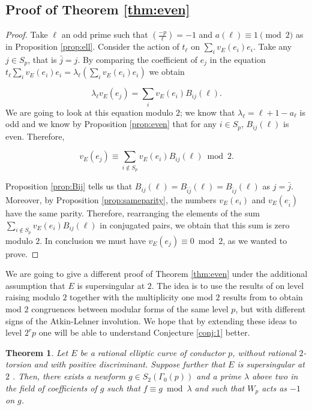 \documentclass[13pt]{amsart}
\newtheorem{theorem}{Theorem}
\theoremstyle{remark}
\numberwithin{theorem}{section} \numberwithin{equation}{section}
\begin{document}
\subsection{Proof of Theorem \ref{thm:even}}

\begin{proof}
Take $\ell$ an odd prime such that $\left(\frac{-p}{\ell}\right)= -1$ and 
$a(\ell)\equiv 1 \pmod{2}$ as in Proposition \ref{prop:ell}. Consider the action 
of $t_{\ell}$ on $\sum_i v_E(e_i)e_i$. Take any $j \in S_p$, that is 
$\bar{j}=j$. By comparing the coefficient of $e_j$ in the equation 
$t_{\ell}\sum_i v_E(e_i)e_i= \lambda_{\ell} (\sum_i v_E(e_i)e_i)$ we obtain

\[ \lambda_{\ell}v_E(e_{j})= \sum_i v_E(e_i)B_{ij}(\ell)  .\]
 We are going to look at this equation modulo $2$; we know that $\lambda_{\ell}=\ell+1-a_{\ell}$ is odd and we know by Proposition \ref{prop:even} that for any $i \in S_{p}$, $B_{ij}(\ell)$ is even. Therefore,
 
 \[  v_E(e_j) \equiv \sum_{i \not \in S_p} v_E(e_i) B_{ij}(\ell) \bmod{2}  . \]
 
 Proposition \ref{prop:Bij} tells us that 
$B_{ij}(\ell)=B_{\bar{i}\bar{j}}(\ell)=B_{\bar{i}j}(\ell)$ as $j=\bar{j}$. 
Moreover, by Proposition \ref{prop:sameparity}, the numbers $v_E(e_{i})$ and 
$v_E(e_{\bar{i}})$ have the same parity. Therefore, rearranging the elements of 
the sum $\sum_{i \not \in S_p} v_E(e_i) B_{ij}(\ell)$ in conjugated pairs, we 
obtain that this sum is zero modulo $2$. In conclusion we must have 
$v_E(e_j) \equiv 0 \bmod{2}$, as we wanted to prove.
\end{proof}

\bigskip
We are going to give a different proof of Theorem \ref{thm:even} under the 
additional assumption that $E$ is supersingular at $2$. 
The idea is to use the results of \cite{LeH} on level raising modulo $2$ 
together with the multiplicity one mod $2$ results from \cite{Emerton} to obtain 
mod $2$ congruences between modular forms of the same level $p$, but with 
different signs of the Atkin-Lehner involution. We hope that by extending these 
ideas to level $2^r p$ one will be able to understand Conjecture \ref{conj:1} 
better. 

\begin{theorem}
Let $E$ be a rational elliptic curve of conductor $p$, without rational $2$-torsion and with positive discriminant. Suppose further that $E$ is supersingular
at $2$ . Then, there exists a newform $g \in S_{2}(\Gamma_{0}(p))$ and a prime $\lambda$ above two in the field
of coefficients of $g$ such that $f \equiv g \bmod{\lambda}$ and such that $W_{p}$ acts as $-1$ on $g$.
\end{theorem}
\end{document}
